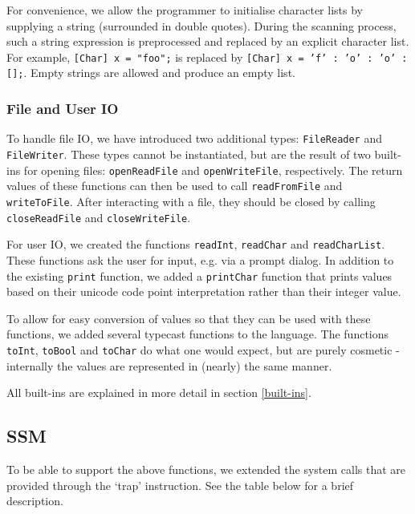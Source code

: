 \documentclass[a4paper]{article}
\begin{document}
For convenience, we allow the programmer to initialise character lists by supplying a string (surrounded in double quotes). During the scanning process, such a string expression is preprocessed and replaced by an explicit character list. For example, {\tt [Char] x = "foo";} is replaced by {\tt [Char] x = 'f' : 'o' : 'o' : [];}. Empty strings are allowed and produce an empty list.

\subsubsection{File and User IO}

To handle file IO, we have introduced two additional types: \texttt{FileReader} and \texttt{FileWriter}. These types cannot be instantiated, but are the result of two built-ins for opening files: \texttt{openReadFile} and \texttt{openWriteFile}, respectively. The return values of these functions can then be used to call \texttt{readFromFile} and \texttt{writeToFile}. After interacting with a file, they should be closed by calling \texttt{closeReadFile} and \texttt{closeWriteFile}.

For user IO, we created the functions \texttt{readInt}, \texttt{readChar} and \texttt{readCharList}. These functions ask the user for input, e.g. via a prompt dialog. In addition to the existing \texttt{print} function, we added a \texttt{printChar} function that prints values based on their unicode code point interpretation rather than their integer value.

To allow for easy conversion of values so that they can be used with these functions, we added several typecast functions to the language. The functions \texttt{toInt}, \texttt{toBool} and \texttt{toChar} do what one would expect, but are purely cosmetic - internally the values are represented in (nearly) the same manner.

All built-ins are explained in more detail in section \ref{built-ins}.

\subsection{SSM}

To be able to support the above functions, we extended the system calls that are provided through the `trap' instruction. See the table below for a brief description.
\end{document}
